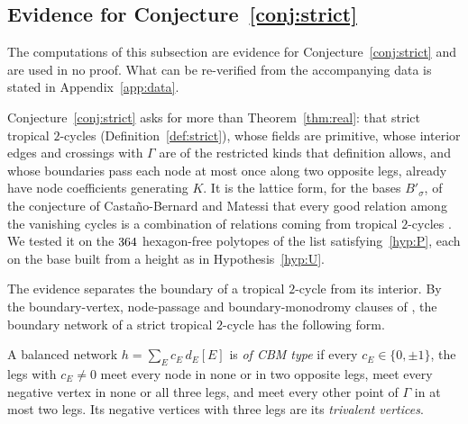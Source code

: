 \subsection{Evidence for Conjecture~\ref{conj:strict}}\label{ssec:evidence}
The computations of this subsection are evidence for Conjecture~\ref{conj:strict} and are used in no proof. What can be
re-verified from the accompanying data is stated in Appendix~\ref{app:data}.

Conjecture~\ref{conj:strict} asks for more than Theorem~\ref{thm:real}: that strict tropical $2$-cycles
(Definition~\ref{def:strict}), whose fields are primitive, whose interior edges and crossings with $\Gamma$ are of the restricted
kinds that definition allows, and whose boundaries pass each node at most once along two opposite legs, already have node
coefficients generating $K$. It is the lattice form, for the bases $B'_\sigma$, of the
conjecture of Casta\~no-Bernard and Matessi that every good relation among the vanishing cycles is a combination of
relations coming from tropical $2$-cycles \cite[\S1, Conj.~8.3]{CBM}. We tested it on the $364$ hexagon-free
polytopes of the list satisfying~\ref{hyp:P}, each on the base built from a height as in Hypothesis~\ref{hyp:U}.

The evidence separates the boundary of a tropical $2$-cycle from its interior. By the boundary-vertex, node-passage and boundary-monodromy clauses of
\cite[Def.~7.2]{CBM}, the boundary network of a strict tropical $2$-cycle has the following form.

\begin{definition}\label{def:cbmshaped}
A balanced network $h=\sum_Ec_E\,d_E[E]$ is \emph{of CBM type} if every $c_E\in\{0,\pm1\}$, the legs with $c_E\ne0$ meet
every node in none or in two opposite legs, meet every negative vertex in none or all three legs, and meet every other
point of $\Gamma$ in at most two legs. Its negative vertices with three legs are its \emph{trivalent vertices}.
\end{definition}

